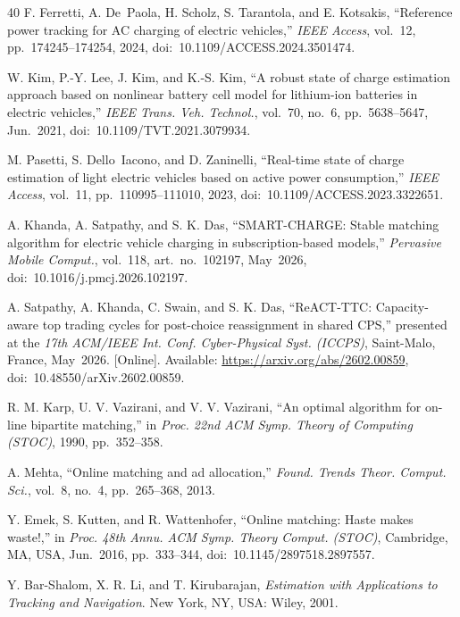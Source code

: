 \documentclass{ieeeaccess}
\begin{document}
\begin{thebibliography}{40}
         F. Ferretti, A. De~Paola, H. Scholz, S. Tarantola, and E. Kotsakis, ``Reference power tracking for AC charging of electric vehicles,'' \textit{IEEE Access}, vol.~12, pp.~174245--174254, 2024, doi:~10.1109/ACCESS.2024.3501474.

         W. Kim, P.-Y. Lee, J. Kim, and K.-S. Kim, ``A robust state of charge estimation approach based on nonlinear battery cell model for lithium-ion batteries in electric vehicles,'' \textit{IEEE Trans. Veh. Technol.}, vol.~70, no.~6, pp.~5638--5647, Jun.~2021, doi:~10.1109/TVT.2021.3079934.

         M. Pasetti, S. Dello~Iacono, and D. Zaninelli, ``Real-time state of charge estimation of light electric vehicles based on active power consumption,'' \textit{IEEE Access}, vol.~11, pp.~110995--111010, 2023, doi:~10.1109/ACCESS.2023.3322651.

         A. Khanda, A. Satpathy, and S. K. Das, ``SMART-CHARGE: Stable matching algorithm for electric vehicle charging in subscription-based models,'' \textit{Pervasive Mobile Comput.}, vol.~118, art.~no.~102197, May~2026, doi:~10.1016/j.pmcj.2026.102197.

         A. Satpathy, A. Khanda, C. Swain, and S. K. Das, ``ReACT-TTC: Capacity-aware top trading cycles for post-choice reassignment in shared CPS,'' presented at the \textit{17th ACM/IEEE Int. Conf. Cyber-Physical Syst. (ICCPS)}, Saint-Malo, France, May~2026. [Online]. Available: \url{https://arxiv.org/abs/2602.00859}, doi:~10.48550/arXiv.2602.00859.

         R. M. Karp, U. V. Vazirani, and V. V. Vazirani, ``An optimal algorithm for on-line bipartite matching,'' in \textit{Proc. 22nd ACM Symp. Theory of Computing (STOC)}, 1990, pp.~352--358.

         A. Mehta, ``Online matching and ad allocation,'' \textit{Found. Trends Theor. Comput. Sci.}, vol.~8, no.~4, pp.~265--368, 2013.

         Y. Emek, S. Kutten, and R. Wattenhofer, ``Online matching: Haste makes waste!,'' in \textit{Proc. 48th Annu. ACM Symp. Theory Comput. (STOC)}, Cambridge, MA, USA, Jun.~2016, pp.~333--344, doi:~10.1145/2897518.2897557.

         Y. Bar-Shalom, X. R. Li, and T. Kirubarajan, \textit{Estimation with Applications to Tracking and Navigation}. New York, NY, USA: Wiley, 2001.


\end{thebibliography}
\end{document}
